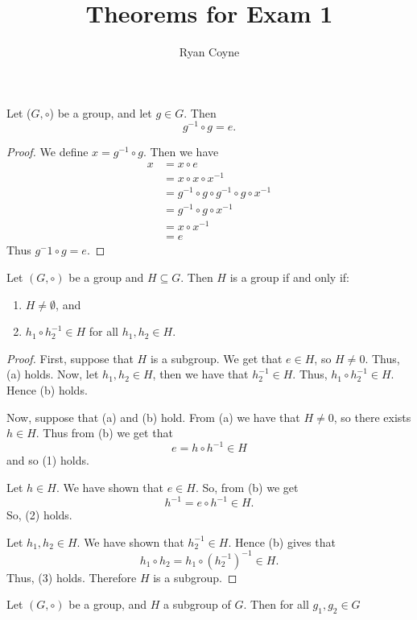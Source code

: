 \documentclass[12pt]{article}
\title{Theorems for Exam 1}
\author{Ryan Coyne}
\begin{document}
\maketitle

\begin{theorem}
    Let (\(G, \circ\)) be a group, and let \(g\in G\). Then
    \begin{equation*}
        g^{-1} \circ g = e.
    \end{equation*}
\end{theorem}

\begin{proof}
    We define \(x = g^{-1}\circ g\). Then we have
    \begin{equation*}
        \begin{split}
            x &= x\circ e\\
            & = x \circ x \circ x^{-1}\\
            &= g^{-1} \circ g \circ g^{-1} \circ g \circ x^{-1}\\
            &= g^{-1} \circ g \circ x^{-1}\\
            &= x \circ x^{-1}\\
            &= e
        \end{split}
    \end{equation*}
    Thus \(g^-1\circ g = e\).
\end{proof}

\begin{theorem}
    Let \((G, \circ)\) be a group and \(H\subseteq G\). Then \(H\) is a group if and only if:
    \begin{enumerate}[label=\alph*)]
        \item \(H\neq \emptyset\), and
        \item \(h_1 \circ h_2^{-1}\in H\) for all \(h_1, h_2\in H\).
    \end{enumerate}
\end{theorem}
\begin{proof}
    First, suppose that \(H\) is a subgroup. We get that \(e\in H\), so \(H\neq 0\). Thus, (a) holds. Now, let \(h_1, h_2\in H\), then we have that \(h_2^{-1}\in H\). Thus, \(h_1\circ h_2^{-1}\in H\). Hence (b) holds. 

    Now, suppose that (a) and (b) hold. From (a) we have that \(H\neq 0\), so there exists \(h\in H\). Thus from (b) we get that 
    \begin{equation*}
        e = h\circ h^{-1}\in H
    \end{equation*}
    and so (1) holds. 

    Let \(h\in H\). We have shown that \(e\in H\). So, from (b) we get
    \begin{equation*}
        h^{-1} = e \circ h^{-1} \in H.
    \end{equation*}
    So, (2) holds.
    
    Let \(h_1, h_2\in H\). We have shown that \(h_2^{-1}\in H\). Hence (b) gives that
    \begin{equation*}
        h_1\circ h_2= h_1\circ (h_2^{-1})^{-1} \in H.
    \end{equation*}
    Thus, (3) holds. Therefore \(H\) is a subgroup. 
\end{proof}

\begin{theorem}
    Let \((G, \circ)\) be a group, and \(H\) a subgroup of \(G\). Then for all \(g_1, g_2\in G\)    
\end{theorem}
\end{document}
